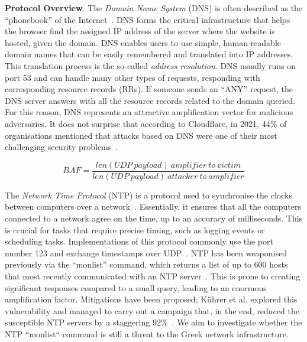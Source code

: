 \textbf{Protocol Overview}. The \textit{Domain Name System} (DNS) is often described as the ``phonebook'' of the Internet~\cite{cloud_dns}. DNS forms the critical infrastructure that helps the browser find the assigned IP address of the server where the website is hosted, given the domain. DNS enables users to use simple, human-readable domain names that can be easily remembered and translated into IP addresses. This translation process is the so-called \textit{address resolution}. DNS usually runs on port 53 and can handle many other types of requests, responding with corresponding resource records (RRs). If someone sends an ``ANY'' request, the DNS server answers with all the resource records related to the domain queried.  For this reason, DNS represents an attractive amplification vector for malicious adversaries. It does not surprise that according to Cloudflare, in 2021, 44\% of organisations mentioned that attacks based on DNS were one of their most challenging security problems~\cite{cloud_dns_threat_landscape}.


\begin{figure}[t]
    \small
    \begin{equation}
    BAF = \frac{len(UDP\ payload)\ amplifier\ to\ victim}{len(UDP\ payload)\ attacker\ to\ amplifier}
    \label{eq:baf}
    \end{equation}
\end{figure}

\vspace{-0.68pt}
 The \textit{Network Time Protocol} (NTP) is a protocol used to synchronise the clocks between computers over a network~\cite{wiki_ntp}. Essentially, it ensures that all the computers connected to a network agree on the time, up to an accuracy of milliseconds. This is crucial for tasks that require precise timing, such as logging events or scheduling tasks. Implementations of this protocol commonly use the port number 123 and exchange timestamps over UDP~\cite{wiki_ntp}. NTP has been weaponised previously via the ``monlist'' command, which returns a list of up to 600 hosts that most recently communicated with an NTP server~\cite{cloudflare_ntp_ampl}.  This is prone to creating significant responses compared to a small query, leading to an enormous amplification factor. Mitigations have been proposed; K{\"u}hrer et al. explored this vulnerability and managed to carry out a campaign that, in the end, reduced the susceptible NTP servers by a staggering 92\%~\cite{exit_hell}. We aim to investigate whether the NTP ``monlist`` command is still a threat to the Greek network infrastructure.

